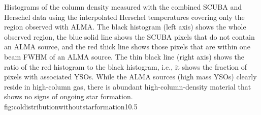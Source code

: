 \documentclass[twocolumn]{aastex61}
\begin{document}



{Histograms of the column density measured with the combined SCUBA and Herschel
data using the interpolated Herschel temperatures covering only the region
observed with ALMA.  The black histogram (left axis) shows the whole observed region,
the blue solid line shows the SCUBA pixels that do not contain an ALMA source,
and the red thick line shows those pixels that are within one beam
FWHM of an ALMA source.  The thin black line (right axis) shows the ratio of
the red histogram to the black histogram, i.e., it shows the fraction of pixels
with associated
YSOs.  While the ALMA sources (high mass YSOs)
clearly reside in high-column gas, there is abundant high-column-density
material that shows no signs of ongoing star formation.}
{fig:coldistributionwithoutstarformation}{1}{0.5\textwidth}



\end{document}
